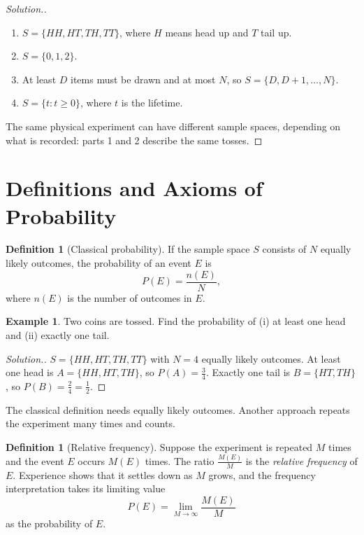 \documentclass[12pt,a4paper]{report}
\theoremstyle{definition}
\newtheorem{definition}[thm]{Definition}
\newtheorem{example}[thm]{Example}
\theoremstyle{plain}
\theoremstyle{definition}
\newenvironment{solution}
  {\renewcommand{\qedsymbol}{}\begin{proof}[\textit{Solution}.]}
  {\end{proof}}
\begin{document}
\begin{solution}
\begin{enumerate}
\item $S = \{HH, HT, TH, TT\}$, where $H$ means head up and $T$ tail up.
\item $S = \{0, 1, 2\}$.
\item At least $D$ items must be drawn and at most $N$, so $S = \{D, D + 1, \dots, N\}$.
\item $S = \{t : t\ge 0\}$, where $t$ is the lifetime.
\end{enumerate}
The same physical experiment can have different sample spaces, depending on what is
recorded: parts 1 and 2 describe the same tosses.
\end{solution}

\section{Definitions and Axioms of Probability}

\begin{definition}[Classical probability]
\label{def:classical}
If the sample space $S$ consists of $N$ equally likely outcomes, the probability of an
event $E$ is
\[P(E) = \frac{n(E)}{N},\]
where $n(E)$ is the number of outcomes in $E$.
\end{definition}

\begin{example}
\label{ex:twocoins}
Two coins are tossed. Find the probability of (i) at least one head and (ii) exactly
one tail.
\end{example}

\begin{solution}
$S = \{HH, HT, TH, TT\}$ with $N = 4$ equally likely outcomes. At least one head is
$A = \{HH, HT, TH\}$, so $P(A) = \frac34$. Exactly one tail is $B = \{HT, TH\}$, so
$P(B) = \frac24 = \frac12$.
\end{solution}

The classical definition needs equally likely outcomes. Another approach repeats the
experiment many times and counts.

\begin{definition}[Relative frequency]
\label{def:relfreq}
Suppose the experiment is repeated $M$ times and the event $E$ occurs $M(E)$ times.
The ratio $\frac{M(E)}{M}$ is the \emph{relative frequency} of $E$. Experience shows
that it settles down as $M$ grows, and the frequency interpretation takes its limiting
value
\[P(E) = \lim_{M\to\infty}\frac{M(E)}{M}\]
as the probability of $E$.
\end{definition}
\end{document}
